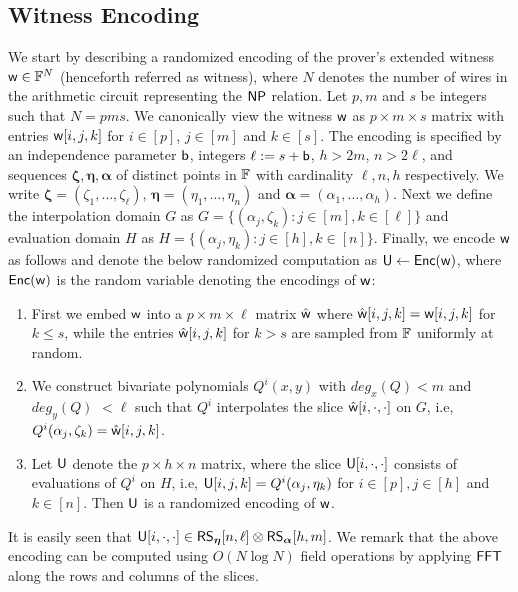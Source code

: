 \subsection{Witness Encoding}\label{sec:witencoding}
We start by describing a randomized encoding of the prover's extended witness
$\mathsf{w}\in \mathbb{F}^N$ (henceforth referred as witness), where $N$ denotes the number
of wires in the arithmetic circuit representing the $\mathsf{NP}$ relation. Let $p,m$ and $s$ be
integers such that $N=pms$. We canonically view the
witness $\mathsf{w}$ 
as $p\times m\times s$ matrix with entries $\mathsf{w}[i,j,k]$ for $i\in [p]$,
$j\in [m]$ and $k\in [s]$. The encoding is specified by an independence 
parameter $\mathsf{b}$, integers $\ell := s+\mathsf{b}$, $h>2m$, $n>2\ell$, and sequences
$\bm{\zeta},\bm{\eta},\bm{\alpha}$ of distinct points in $\mathbb{F}$ with cardinality 
$\ell,n,h$ respectively. We write $\bm{\zeta}=(\zeta_1,\ldots,\zeta_\ell)$,
$\bm{\eta}=(\eta_1,\ldots,\eta_n)$ and $\bm{\alpha}=(\alpha_1,\ldots,\alpha_h)$. 
Next we define the interpolation domain $G$ as $G=\{(\alpha_j,\zeta_k): j\in[m],
k\in [\ell]\}$ and evaluation domain $H$ as $H=\{(\alpha_j,\eta_k): j\in [h],
k\in [n]\}$. Finally, we encode $\mathsf{w}$ as follows and denote the below randomized computation as $\mathsf{U}\gets \mathsf{Enc}(\mathsf{w})$, where  $\mathsf{Enc}(\mathsf{w})$ is the random variable denoting the encodings of $\mathsf{w}$:
\begin{enumerate}[{\rm (i)}]
\item First we embed $\mathsf{w}$ into a $p\times m\times \ell$ matrix $\hat{\mathsf{w}}$
where $\hat{\mathsf{w}}[i,j,k]=\mathsf{w}[i,j,k]$ for $k\leq s$, while the entries
$\hat{\mathsf{w}}[i,j,k]$ for $k>s$ are sampled from $\mathbb{F}$ uniformly at random.
\item We construct bivariate polynomials $Q^i(x,y)$ with $deg_x(Q)<m$ and
$deg_y(Q) $ $<\ell$ such that $Q^i$ interpolates the slice
$\hat{\mathsf{w}}[i,\cdot,\cdot]$ on $G$, i.e,
$Q^i(\alpha_j,\zeta_k)=\hat{\mathsf{w}}[i,j,k]$. 
\item Let $\mathsf{U}$ denote the $p\times h\times n$ matrix, where the slice
$\mathsf{U}[i,\cdot,\cdot]$ consists of evaluations of $Q^i$ on $H$, i.e,
$\mathsf{U}[i,j,k]=Q^i(\alpha_j,\eta_k)$ for $i\in [p], j\in [h]$ and $k\in [n]$.
Then $\mathsf{U}$ is a randomized encoding of $\mathsf{w}$.
\end{enumerate}
 It is easily seen
that $\mathsf{U}[i,\cdot,\cdot]\in \mathsf{RS}_{\bm{\eta}}[n,\ell]\otimes \mathsf{RS}_{\bm{\alpha}}[h,m]$. 
We remark that the above
encoding can be computed using $O(N\log N)$ field operations by applying $\mathsf{FFT}$ along the rows and columns of the slices. %
